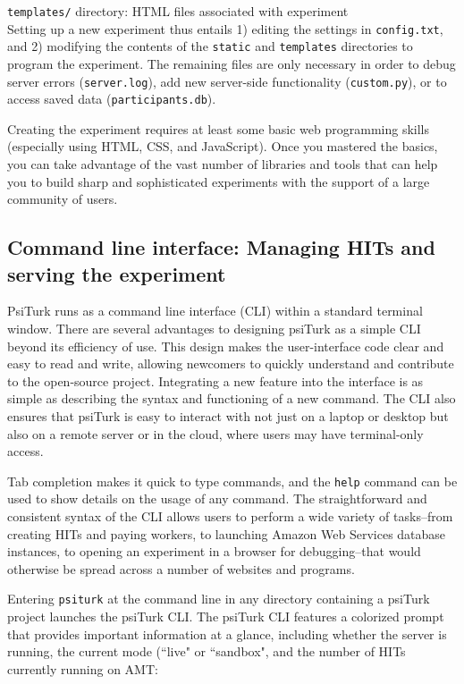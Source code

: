 \documentclass[twocolumn]{svjour3}          %
\begin{document}
\noindent \texttt{templates/} directory: HTML files associated with experiment \\


Setting up a new experiment thus entails 1) editing the settings in \texttt{config.txt}, and 2) modifying the contents of the \texttt{static} and \texttt{templates} directories to program the experiment.
The remaining files are only necessary in order to debug server errors (\texttt{server.log}), add new server-side functionality (\texttt{custom.py}), or to access saved data (\texttt{participants.db}).

Creating the experiment requires at least some basic web programming skills (especially using HTML, CSS, and JavaScript).
Once you mastered the basics, you can take advantage of the vast number of libraries and tools that can help you to build sharp and sophisticated experiments with the support of a large community of users.


\subsection{Command line interface: Managing HITs and serving the experiment}

PsiTurk runs as a command line interface (CLI) within a standard terminal window.
There are several advantages to designing psiTurk as a simple CLI beyond its efficiency of use. This
design makes the user-interface code clear and easy to read and write, allowing newcomers to quickly
understand and contribute to the open-source project. Integrating a new feature into the interface
is as simple as describing the syntax and functioning of a new command. The CLI also ensures that
psiTurk is easy to interact with not just on a laptop or desktop but also on a remote server or in
the cloud, where users may have terminal-only access.
 
Tab completion makes it quick to type commands, and the \texttt{help} command can be used to show
details on the usage of any command. 
The straightforward and consistent syntax of the CLI allows
users to perform a wide variety of tasks--from creating HITs and paying workers, to launching Amazon
Web Services database instances, to opening an experiment in a browser for debugging--that
would otherwise be spread across a number of websites and programs. 

Entering
\texttt{psiturk} at the command line in any directory containing a psiTurk project launches the
psiTurk CLI.
The psiTurk CLI features a colorized prompt that provides important information at a glance, including
whether the server is running, the current mode (``live" or ``sandbox", and the number of HITs currently running on AMT:
\end{document}
